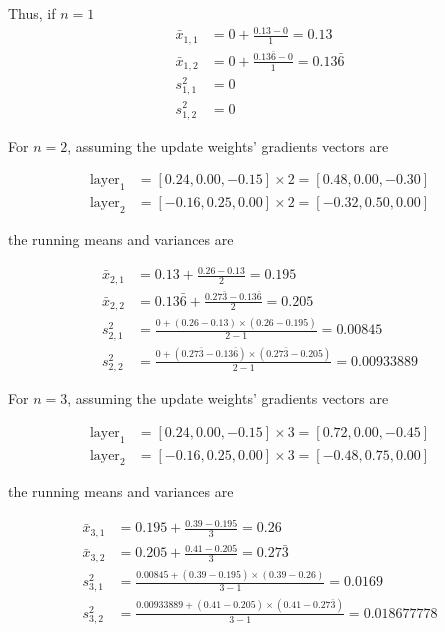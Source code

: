 \documentclass[MSc,english,french]{ulthese}
\begin{document}
Thus, if $n = 1$
\begin{align*}
\bar{x}_{1, 1} &= 0 + \frac{0.13 - 0}{1} = 0.13 \\
\bar{x}_{1, 2} &= 0 + \frac{0.13\bar{6} - 0}{1} = 0.13\bar{6}  \\
s^2_{1, 1} &= 0 \\
s^2_{1, 2} &= 0
\end{align*}

For $n=2$, assuming the update weights' gradients vectors are 

\begin{align*}
\text{layer}_1 &= [ 0.24, 0.00, -0.15] \times 2 = [ 0.48, 0.00, -0.30] \\
\text{layer}_2 &= [-0.16, 0.25, 0.00] \times 2 = [-0.32, 0.50, 0.00] 
\end{align*}

the running means and variances are

\begin{align*}
\bar{x}_{2, 1} &= 0.13 + \frac{0.26 - 0.13}{2} = 0.195 \\
\bar{x}_{2, 2} &= 0.13\bar{6} + \frac{0.27\bar{3} - 0.13\bar{6}}{2} =  0.205\\
s^2_{2, 1} &= \frac{0 + (0.26 - 0.13)\times(0.26 - 0.195)}{2 - 1} = 0.00845\\
s^2_{2, 2} &= \frac{0 + (0.27\bar{3} - 0.13\bar{6})\times(0.27\bar{3} - 0.205)}{2 - 1} = 0.00933889
\end{align*}

For $n=3$, assuming the update weights' gradients vectors are  

\begin{align*}
\text{layer}_1 &= [ 0.24, 0.00, -0.15] \times 3 = [ 0.72, 0.00, -0.45] \\
\text{layer}_2 &= [-0.16, 0.25, 0.00] \times 3 = [-0.48, 0.75, 0.00] 
\end{align*}

the running means and variances are

\begin{align*}
\bar{x}_{3, 1} &= 0.195 + \frac{0.39 - 0.195}{3} = 0.26 \\
\bar{x}_{3, 2} &= 0.205 + \frac{0.41 - 0.205}{3} = 0.27\bar{3} \\
s^2_{3, 1} &= \frac{0.00845 + (0.39 - 0.195)\times(0.39 - 0.26)}{3 - 1} = 0.0169\\
s^2_{3, 2} &= \frac{0.00933889 + (0.41 - 0.205)\times(0.41 - 0.27\bar{3})}{3 - 1} = 0.018677778
\end{align*}
	
\end{document}
